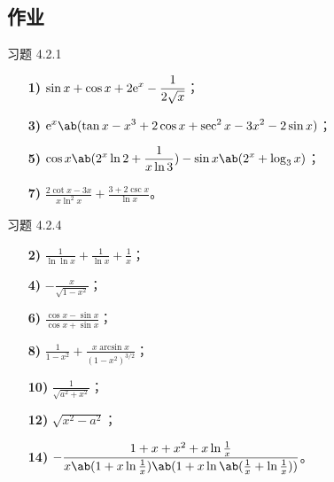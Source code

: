 \subsection{作业}

\begin{problem}
	习题 4.2.1

	\begin{solution}
		\begin{enumerate}
			\item[\textbf{1)}] $\displaystyle \sin x + \cos x + 2 \mathrm{e}^x - \frac{1}{2 \sqrt x}$；
			\item[\textbf{3)}] $\displaystyle \E^x \ab(\tan x - x^3 + 2\cos x + \sec^2 x - 3x^2 - 2\sin x)$；
			\item[\textbf{5)}] $\displaystyle \cos x \ab(2^x \ln 2 + \frac{1}{x \ln 3}) - \sin x \ab(2^x + \log_3 x)$；
			\item[\textbf{7)}] $\displaystyle \frac{2 \cot x - 3x}{x \ln^2 x} + \frac{3 + 2 \csc x}{\ln x}$。
		\end{enumerate}
	\end{solution}
\end{problem}

\begin{problem}
	习题 4.2.4

	\begin{solution}
		\begin{enumerate}
			\item[\textbf{2)}] $\displaystyle \frac{1}{\ln \ln x} + \frac{1}{\ln x} + \frac{1}{x}$；
			\item[\textbf{4)}] $\displaystyle -\frac{x}{\sqrt{1 - x^2}}$；
			\item[\textbf{6)}] $\displaystyle \frac{\cos x - \sin x}{\cos x + \sin x}$；
			\item[\textbf{8)}] $\displaystyle \frac{1}{1 - x^2} + \frac{x \arcsin x}{(1 - x^2)^{3/2}}$；
			\item[\textbf{10)}] $\displaystyle \frac{1}{\sqrt{a^2 + x^2}}$；
			\item[\textbf{12)}] $\displaystyle \sqrt{x^2 - a^2}$；
			\item[\textbf{14)}] $\displaystyle -\frac{1 + x + x^2 + x \ln \frac{1}{x}}{x \ab(1 + x \ln \frac{1}{x}) \ab(1 + x \ln \ab(\frac{1}{x} + \ln \frac{1}{x}))}$。
		\end{enumerate}
	\end{solution}
\end{problem}

